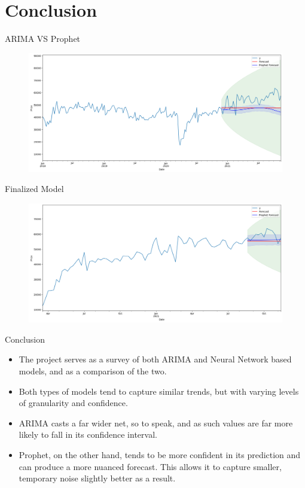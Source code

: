 \documentclass[9pt, dvipsnames]{beamer}
\begin{document}
\section{Conclusion}
    \begin{frame}{ARIMA VS Prophet}
        \begin{figure}
            \centering
            \includegraphics[height=0.47\paperheight]{assets/Model-Comparison.png}
            \label{fig:Model-Comparison}
        \end{figure}
    \end{frame}
    \begin{frame}{Finalized Model}
        \begin{figure}
            \centering
            \includegraphics[height=0.47\paperheight]{assets/Model-Comparison-Split.png}
            \label{fig:Model-Comparison-Split}
        \end{figure}
    \end{frame}
    \begin{frame}{Conclusion}
        \begin{itemize}
            \item The project serves as a survey of both ARIMA and Neural Network based models, and as a 
            comparison of the two. \pause
            \item Both types of models tend to capture similar trends, but with varying levels of granularity 
            and confidence. \pause
            \item ARIMA casts a far wider net, so to speak, and as such values are far more likely to fall in 
            its confidence interval. \pause
            \item Prophet, on the other hand, tends to be more confident in its prediction and can produce a 
            more nuanced forecast. This allows it to capture smaller, temporary noise slightly better as a 
            result.
        \end{itemize}
    \end{frame}
\end{document}
